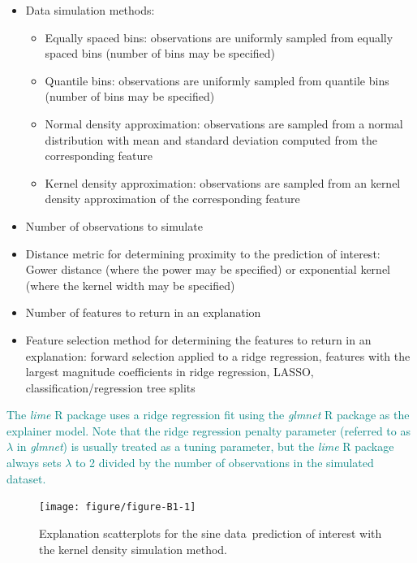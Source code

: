 \documentclass[AMS,STIX2COL]{WileyNJD-v2}\usepackage[]{graphicx}\usepackage[]{color}
\newenvironment{knitrout}{}{} %
\newcommand{\kge}[1]{\textcolor{teal}{#1}}
\newcommand{\data}{sine data}
\begin{document}
\begin{itemize}

\item Data simulation methods:

\begin{itemize}
\item Equally spaced bins: observations are uniformly sampled from equally spaced bins (number of bins may be specified)
\item Quantile bins: observations are uniformly sampled from quantile bins (number of bins may be specified)
\item Normal density approximation: observations are sampled from a normal distribution with mean and standard deviation computed from the corresponding feature
\item Kernel density approximation: observations are sampled from an kernel density approximation of the corresponding feature
\end{itemize}

\item Number of observations to simulate

\item Distance metric for determining proximity to the prediction of interest: Gower distance (where the power may be specified) or exponential kernel (where the kernel width may be specified)

\item Number of features to return in an explanation

\item Feature selection method for determining the features to return in an explanation: forward selection applied to a ridge regression, features with the largest magnitude coefficients in ridge regression, LASSO, classification/regression tree splits

\end{itemize}

\kge{The \emph{lime} R package uses a ridge regression fit using the \emph{glmnet} R package \citep{simon:2011} as the explainer model. Note that the ridge regression penalty parameter (referred to as $\lambda$ in \emph{glmnet}) is usually treated as a tuning parameter, but the \emph{lime} R package always sets $\lambda$ to 2 divided by the number of observations in the simulated dataset.}

\begin{figure}[!thp]
\begin{knitrout}
\color{fgcolor}

{\centering \texttt{[image: figure/figure-B1-1]} 

}



\end{knitrout}
\caption{Explanation scatterplots for the \data \ prediction of interest with the kernel density simulation method.}
\label{fig:figure-B1}
\end{figure}
\end{document}
